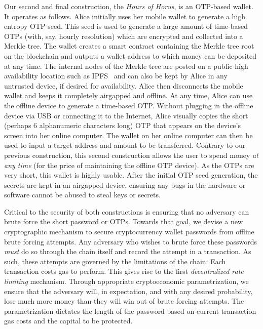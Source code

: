 Our second and final construction, the \emph{Hours of Horus},
is an OTP-based wallet. It operates as follows.
Alice initially uses her mobile wallet to generate a high entropy OTP seed.
This seed is used to generate
a large amount of time-based OTPs (with, say, hourly resolution) which are encrypted
and collected into a Merkle tree. The wallet creates a smart contract containing the
Merkle tree root on the blockchain and outputs a wallet address to which money can
be deposited at any time. The internal nodes of the Merkle tree are posted on a public
high availability location such as IPFS~\cite{ipfs} and can also be kept by Alice
in any untrusted device, if desired for availability. Alice then disconnects the mobile wallet and keeps it
completely airgapped and offline. At any time, Alice can use the offline device to generate
a time-based OTP. Without plugging in the offline device via USB or connecting it
to the Internet, Alice visually copies the short (perhaps $6$ alphanumeric characters long)
OTP that appears on the device's screen into her online computer. The wallet on
her online computer can then be used to input a target address and amount to be transferred.
Contrary to our previous construction, this second construction allows the user
to spend money \emph{at any time} (for the price of maintaining
the offline OTP device). As the OTPs are very short, this wallet is highly usable.
After the initial OTP seed generation, the secrets are kept in an
airgapped device, ensuring any bugs in the hardware or software cannot be abused
to steal keys or secrets.

Critical to the security of both constructions is ensuring that no adversary can
brute force the short password or OTPs.
Towards that goal, we devise a new cryptographic mechanism to secure cryptocurrency
wallet passwords from offline brute forcing attempts. Any adversary who wishes
to brute force these passwords \emph{must} do so through the chain itself and
record the attempt in a transaction. As such, these attempts are governed by
the limitations of the chain: Each transaction costs gas to perform. This
gives rise to the first \emph{decentralized rate limiting} mechanism. Through
appropriate cryptoeconomic parametrization, we ensure that the adversary will,
in expectation, and with any desired probability, lose much more money than they
will win out of brute forcing attempts. The parametrization dictates the length
of the password based on current transaction gas costs and the capital to be
protected.

